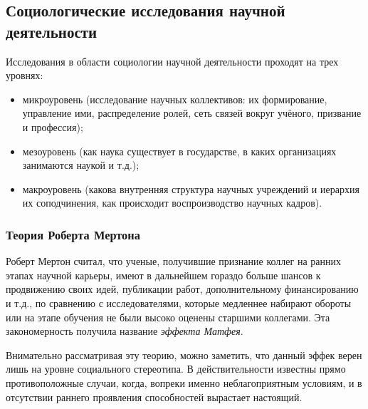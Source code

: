 
\subsection{Социологические исследования научной деятельности}

Исследования в области социологии научной деятельности проходят на трех уровнях:
\begin{itemize}
    \item микроуровень (исследование научных коллективов: их формирование,
    управление ими, распределение ролей, сеть связей вокруг учёного, призвание и профессия);
    \item мезоуровень (как наука существует в государстве, в каких организациях занимаются наукой и т.д.);
    \item макроуровень (какова внутренняя структура научных учреждений и иерархия их соподчинения, как происходит воспроизводство научных кадров).
\end{itemize}

\subsubsection{Теория Роберта Мертона} 

Роберт Мертон считал, что ученые, получившие
признание коллег на ранних этапах научной карьеры, имеют в дальнейшем гораздо
больше шансов к продвижению своих идей, публикации работ, дополнительному
финансированию и т.д., по сравнению с исследователями, которые медленнее
набирают обороты или на этапе обучения не были высоко оценены старшими
коллегами. Эта закономерность получила название \textit{эффекта Матфея}.

Внимательно рассматривая эту теорию, можно заметить, что данный эффек верен лишь на
уровне социального стереотипа. 
В действительности известны прямо противоположные случаи, когда,
вопреки именно неблагоприятным условиям, и в отсутствии раннего проявления
способностей вырастает настоящий.

